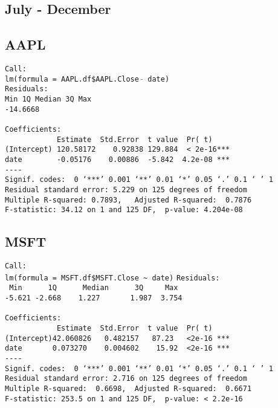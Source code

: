 \documentclass{article}[14pt]
\begin{document}
\subsection{July - December}
\subsection{AAPL}
\texttt{Call: \\
lm(formula = AAPL.df\$AAPL.Close $\tilde{}$ date)\\
Residuals:\\
Min \hspace{35pt} 1Q \qquad Median \qquad 3Q \qquad  Max\\
-14.6668       \\}
\verb| |\\
\verb|Coefficients:|\\
\verb|            Estimate  Std.Error  t value  Pr( t)|\\
\verb|(Intercept) 120.58172    0.92838 129.884  < 2e-16***|\\
\verb|date        -0.05176    0.00886  -5.842  4.2e-08 ***|\\
\verb|----|\\
\verb|Signif. codes:  0 ‘***’ 0.001 ‘**’ 0.01 ‘*’ 0.05 ‘.’ 0.1 ‘ ’ 1|\\
\verb|Residual standard error: 5.229 on 125 degrees of freedom|\\
\verb|Multiple R-squared: 0.7893,	Adjusted R-squared:  0.7876|\\
\verb|F-statistic: 34.12 on 1 and 125 DF,  p-value: 4.204e-08|
\subsection{MSFT}

\verb|Call:|\\
\verb|lm(formula = MSFT.df$MSFT.Close ~ date)|
\verb|Residuals:|\\
\verb| Min      1Q      Median      3Q     Max |\\
\verb|-5.621 -2.668    1.227       1.987  3.754  |\\
\verb| |\\
\verb|Coefficients:|\\
\verb|            Estimate  Std.Error  t value  Pr( t)|\\
\verb|(Intercept)42.060826   0.482157   87.23   <2e-16 ***|\\
\verb|date       0.073270    0.004602    15.92  <2e-16 ***|\\
\verb|----|\\
\verb|Signif. codes:  0 ‘***’ 0.001 ‘**’ 0.01 ‘*’ 0.05 ‘.’ 0.1 ‘ ’ 1|\\
\verb|Residual standard error: 2.716 on 125 degrees of freedom|\\
\verb|Multiple R-squared:  0.6698,	Adjusted R-squared:  0.6671 |\\
\verb|F-statistic: 253.5 on 1 and 125 DF,  p-value: < 2.2e-16|
\end{document}

